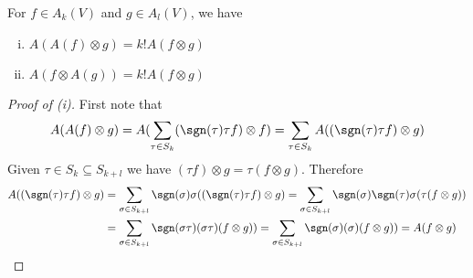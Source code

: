 \begin{frame}
  \begin{lem}
    For $f \in A_k(V)$ and $g \in A_l(V)$, we have
    \begin{enumerate}[(i)]
      \item $A(A(f) \otimes g) = k!A(f \otimes g)$
      \item $A(f \otimes A(g)) = k!A(f \otimes g)$
    \end{enumerate}
  \end{lem}
  \begin{proof}[Proof of (i)]
    First note that
    \begin{displaymath}
      A(A(f) \otimes g) = A(\sum_{\tau \in S_k} (\sgn(\tau) \tau f) \otimes f)
      = \sum_{\tau \in S_k} A((\sgn(\tau) \tau f) \otimes g)
    \end{displaymath}
    Given $\tau \in S_k \subseteq S_{k+l}$ we have $(\tau f) \otimes g = \tau(f
    \otimes g)$.
    Therefore
    \begin{align*}
      A((\sgn(\tau) \tau f) \otimes g) &=
      \sum_{\sigma \in S_{k+l}} \sgn(\sigma)\sigma((\sgn(\tau) \tau f) \otimes g)
      =
      \sum_{\sigma \in S_{k+l}} \sgn(\sigma) \sgn(\tau)
      \sigma(\tau(f \otimes g)) 
      \\
      &=
      \sum_{\sigma \in S_{k+l}} \sgn(\sigma \tau)
      (\sigma \tau)(f \otimes g))
      =
      \sum_{\sigma \in S_{k+l}} \sgn(\sigma)
      (\sigma)(f \otimes g)) = A(f \otimes g)
    \end{align*}
  \end{proof}
\end{frame}

